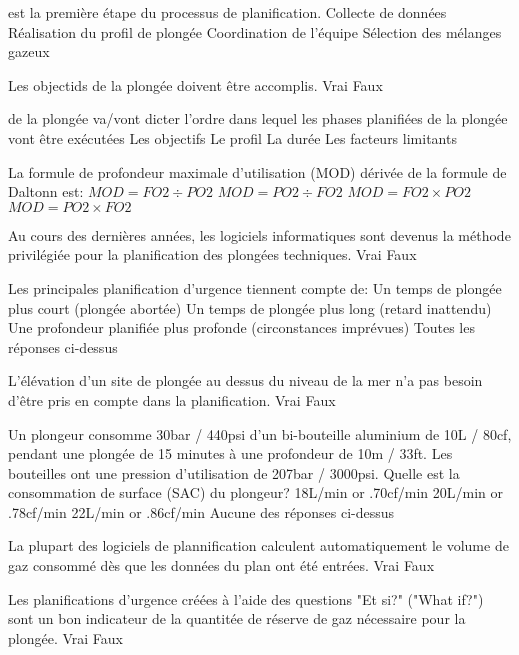 \documentclass[english,12pt,a4paper]{article}
\begin{document}
	\begin{outline}
		\1 \underline{\hspace{1.5cm}} est la première étape du processus de planification.
			\2 Collecte de données
			\2 Réalisation du profil de plongée
			\2 Coordination de l'équipe
			\2 Sélection des mélanges gazeux 

		\1 Les objectids de la plongée doivent être accomplis.
			\2 Vrai
			\2 Faux

		\1 \underline{\hspace{1.5cm}} de la plongée va/vont dicter l'ordre dans lequel les phases planifiées de la plongée vont être exécutées
			\2 Les objectifs
			\2 Le profil
			\2 La durée
			\2 Les facteurs limitants

		\1 La formule de profondeur maximale d'utilisation (MOD) dérivée de la formule de Daltonn est:
			\2 $MOD=FO2 \div PO2$
			\2 $MOD=PO2 \div FO2$
			\2 $MOD=FO2 \times PO2$
			\2 $MOD=PO2 \times FO2$

		\1 Au cours des dernières années, les logiciels informatiques sont devenus la méthode privilégiée pour la planification des plongées techniques.
			\2 Vrai
			\2 Faux

		\1 Les principales planification d'urgence tiennent compte de:
			\2 Un temps de plongée plus court (plongée abortée)
			\2 Un temps de plongée plus long (retard inattendu)
			\2 Une profondeur planifiée plus profonde (circonstances imprévues)
			\2 Toutes les réponses ci-dessus

		\1 L'élévation d'un site de plongée au dessus du niveau de la mer n'a pas besoin d'être pris en compte dans la planification.
			\2 Vrai
			\2 Faux

		\1 Un plongeur consomme 30bar / 440psi d'un bi-bouteille aluminium de 10L / 80cf, pendant une plongée de 15 minutes à une profondeur de 10m / 33ft. Les bouteilles ont une pression d'utilisation de 207bar / 3000psi. Quelle est la consommation de surface (SAC) du plongeur?
			\2 18L/min or .70cf/min
			\2 20L/min or .78cf/min
			\2 22L/min or .86cf/min
			\2 Aucune des réponses ci-dessus

		\1 La plupart des logiciels de plannification calculent automatiquement le volume de gaz consommé dès que les données du plan ont été entrées.
			\2 Vrai
			\2 Faux

		\1 Les planifications d'urgence créées à l'aide des questions "Et si?" ("What if?") sont un bon indicateur de la quantitée de réserve de gaz nécessaire pour la plongée. 
			\2 Vrai
			\2 Faux


\end{outline}
\end{document}
